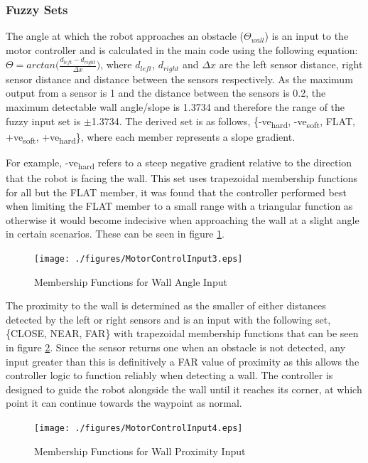 \documentclass[10pt]{article}
\begin{document}
\subsubsection{Fuzzy Sets}
The angle at which the robot approaches an obstacle ($\Theta_{wall}$) is an input to the motor controller and is calculated in the main code using the following equation:
$\Theta = arctan\bigg(\frac{d_{left}-d_{right}}{\Delta x}\bigg)$,
where $d_{left}$, $d_{right}$ and $\Delta x$ are the left sensor distance, right sensor distance and distance between the sensors respectively.
As the maximum output from a sensor is 1 and the distance between the sensors is 0.2, the maximum detectable wall angle/slope is 1.3734 and therefore the range of the fuzzy input set is $\pm$1.3734.
The derived set is as follows, \{-ve\textsubscript{hard}, -ve\textsubscript{soft}, FLAT, +ve\textsubscript{soft}, +ve\textsubscript{hard}\}, where each member represents a slope gradient.

\medskip
For example, -ve\textsubscript{hard} refers to a steep negative gradient relative to the direction that the robot is facing the wall.
This set uses trapezoidal membership functions for all but the FLAT member, it was found that the controller performed best when limiting the FLAT member to a small range with a triangular function as otherwise it would become indecisive when approaching the wall at a slight angle in certain scenarios. 
These can be seen in figure \ref{fig:wallSlope}.
\begin{figure}[H]
    \centering
\texttt{[image: ./figures/MotorControlInput3.eps]}
\caption{Membership Functions for Wall Angle Input}
\label{fig:wallSlope}
\end{figure}

The proximity to the wall is determined as the smaller of either distances detected by the left or right sensors and is an input with the following set, \{CLOSE, NEAR, FAR\} with trapezoidal membership functions that can be seen in figure \ref{fig:wallProx}.
Since the sensor returns one when an obstacle is not detected, any input greater than this is definitively a FAR value of proximity as this allows the controller logic to function reliably when detecting a wall. 
The controller is designed to guide the robot alongside the wall until it reaches its corner, at which point it can continue towards the waypoint as normal.

\begin{figure}[H]
    \centering
\texttt{[image: ./figures/MotorControlInput4.eps]}
\caption{Membership Functions for Wall Proximity Input}
\label{fig:wallProx}
\end{figure}
\end{document}
